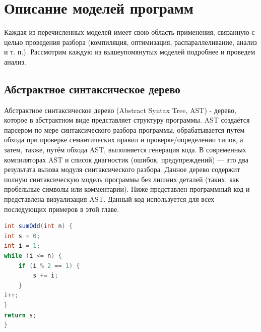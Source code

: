 \section{Описание моделей программ} \label{ch1:sec2}
Каждая из перечисленных моделей имеет свою область применения, связанную с целью проведения разбора (компиляция, оптимизация, распараллеливание, анализ и т. п.). Рассмотрим каждую из вышеупомянутых моделей подробнее и проведем анализ.
\subsection{Абстрактное синтаксическое дерево} \label{ch1:subsec-title-abbr}
Абстрактное синтаксическое дерево (Abstract Syntax Tree, AST) - дерево, которое в абстрактном виде представляет структуру программы. AST создаётся парсером по мере синтаксического разбора программы, обрабатывается путём обхода при проверке семантических правил и проверке/определении типов, а затем, также, путём обхода AST, выполняется генерация кода. В современных компиляторах AST и список диагностик (ошибок, предупреждений) — это два результата вызова модуля синтаксического разбора.
Данное дерево содержит полную синтаксическую модель программы без лишних деталей (таких, как пробельные символы или комментарии). Ниже представлен программный код и представлена визуализация AST. Данный код используется для всех последующих примеров в этой главе.
\begin{lstlisting}[language=Java,
caption={Метод sumOdd}]
int sumOdd(int n) {
int s = 0;
int i = 1;
while (i <= n) {
	if (i % 2 == 1) {
		s += i;
	}
i++;
}
return s;
}
\end{lstlisting}


